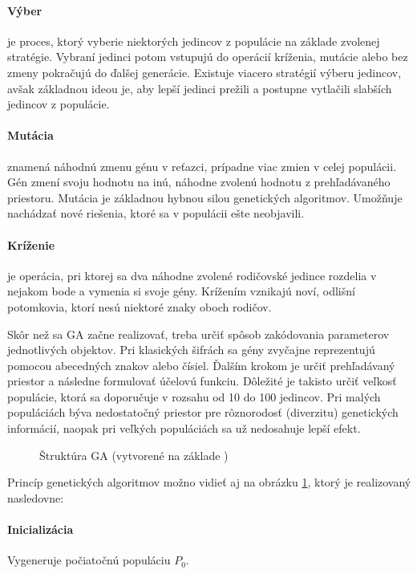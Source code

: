 \paragraph{Výber} je proces, ktorý vyberie niektorých jedincov z populácie na základe zvolenej stratégie.
Vybraní jedinci potom vstupujú do operácií kríženia, mutácie alebo bez zmeny pokračujú do ďalšej generácie.
Existuje viacero stratégií výberu jedincov, avšak základnou ideou je, aby lepší jedinci prežili a postupne vytlačili slabších jedincov z populácie.

\paragraph{Mutácia} znamená náhodnú zmenu génu v reťazci, prípadne viac zmien v celej populácii.
Gén zmení svoju hodnotu na inú, náhodne zvolenú hodnotu z prehľadávaného priestoru.
Mutácia je základnou hybnou silou genetických algoritmov. Umožňuje nachádzať nové riešenia, ktoré sa v populácii ešte neobjavili.

\paragraph{Kríženie} je operácia, pri ktorej sa dva náhodne zvolené rodičovské jedince rozdelia v nejakom bode a vymenia si svoje gény.
Krížením vznikajú noví, odlišní potomkovia, ktorí nesú niektoré znaky oboch rodičov.

Skôr než sa GA začne realizovať, treba určiť spôsob zakódovania parameterov jednotlivých objektov.
Pri klasických šifrách sa gény zvyčajne reprezentujú pomocou abecedných znakov alebo čísiel.
Ďalším krokom je určiť prehľadávaný priestor a následne formulovať účelovú funkciu. Dôležité je takisto určiť veľkosť populácie,
ktorá sa doporučuje v rozsahu od 10 do 100 jedincov.
Pri malých populáciách býva nedostatočný priestor pre rôznorodosť (diverzitu) genetických informácií,
naopak pri veľkých populáciách sa už nedosahuje lepší efekt.

\begin{figure}[!h]
  \centering
  
  \caption{Štruktúra GA (vytvorené na základe \cite{ev})}
  \label{img:ga}
\end{figure}


Princíp genetických algoritmov možno vidieť aj na obrázku \ref{img:ga}, ktorý je realizovaný nasledovne:
\paragraph{Inicializácia} Vygeneruje počiatočnú populáciu $ P_0 $.

